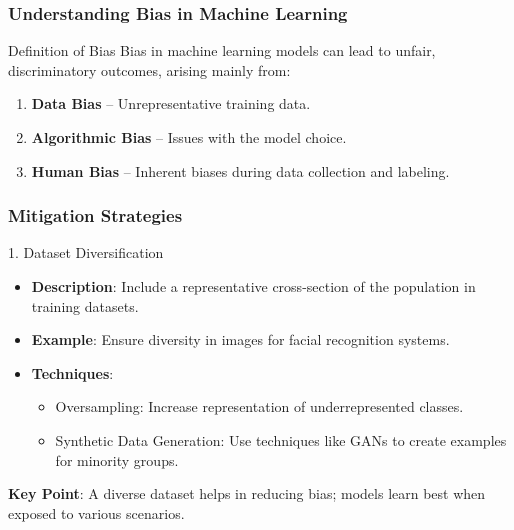 \documentclass[aspectratio=169]{beamer}
\begin{document}
\begin{frame}[fragile]
    \frametitle{Understanding Bias in Machine Learning}
    \begin{block}{Definition of Bias}
        Bias in machine learning models can lead to unfair, discriminatory outcomes, arising mainly from:
    \end{block}
    \begin{enumerate}
        \item \textbf{Data Bias} – Unrepresentative training data.
        \item \textbf{Algorithmic Bias} – Issues with the model choice.
        \item \textbf{Human Bias} – Inherent biases during data collection and labeling.
    \end{enumerate}
\end{frame}

\begin{frame}[fragile]
    \frametitle{Mitigation Strategies}
    \begin{block}{1. Dataset Diversification}
        \begin{itemize}
            \item \textbf{Description}: Include a representative cross-section of the population in training datasets.
            \item \textbf{Example}: Ensure diversity in images for facial recognition systems.
            \item \textbf{Techniques}:
            \begin{itemize}
                \item Oversampling: Increase representation of underrepresented classes.
                \item Synthetic Data Generation: Use techniques like GANs to create examples for minority groups.
            \end{itemize}
        \end{itemize}
        \textbf{Key Point}: A diverse dataset helps in reducing bias; models learn best when exposed to various scenarios.
    \end{block}
\end{frame}
\end{document}
